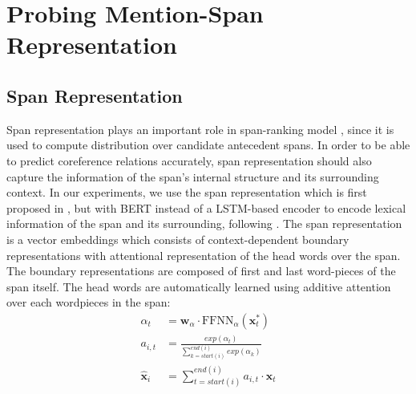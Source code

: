 \documentclass[11pt]{article}
\begin{document}
\section{Probing Mention-Span Representation}


\subsection{Span Representation}
\label{subsection:spanreps}

Span representation plays an important role in span-ranking model \parencite{lee2017end,lee2018higher,joshi2019coref}, since it is used to compute distribution over candidate antecedent spans. In order to be able to predict coreference relations accurately, span representation should also capture the information of the span's internal structure and its surrounding context. In our experiments, we use the span representation which is first proposed in \parencite{lee2017end}, but with BERT \parencite{devlin2019bert} instead of a LSTM-based encoder to encode lexical information of the span and its surrounding, following \parencite{joshi2019coref}. The span representation is a vector embeddings which consists of context-dependent boundary representations with attentional representation of the head words over the span. The boundary representations are composed of first and last word-pieces of the span itself. The head words are automatically learned using additive attention \parencite{bahdanau} over each wordpieces in the span:
\begin{align}
\alpha_{t} &= \pmb{w}_{\alpha} \cdot \text{FFNN}_{\alpha}(\pmb{x}_{t}^{*}) \\ 
a_{i,t} &=  \frac{exp(\alpha_{t})}{\sum\limits_{k=start(i)}^{end(i)} exp(\alpha_{k})} \\ 
\hat{\pmb{x}}_{i} &= \sum\limits_{t=start(i)}^{end(i)} a_{i,t} \cdot \pmb{x}_{t}
\end{align}
\end{document}
